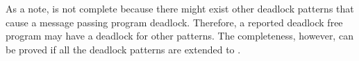 As a note,  is not complete because there might exist other deadlock patterns that cause a message passing program deadlock. Therefore, a reported deadlock free program may have a deadlock for other patterns. The completeness, however, can be proved if all the deadlock patterns are extended to . 

 
 

